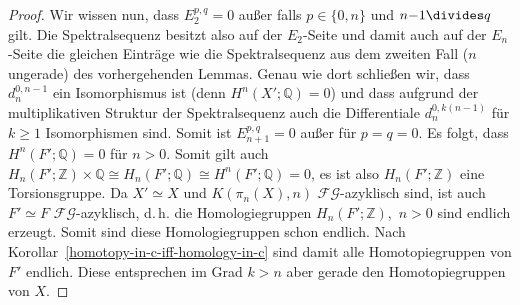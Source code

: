 \documentclass[11pt, a4paper, german]{article}
\theoremstyle{definition}
\theoremstyle{remark}
\newcommand{\Z}{\mathbb{Z}} %
\newcommand{\Q}{\mathbb{Q}} %
\newcommand{\FG}{\mathcal{FG}} %
\renewcommand{\dh}{d.\,h.} %
\begin{document}
\begin{proof}
  Wir wissen nun, dass $E_2^{p,q} = 0$ außer falls $p \in \{ 0, n \}$ und $n{-}1 \divides q$ gilt.
  Die Spektralsequenz besitzt also auf der $E_2$-Seite und damit auch auf der $E_n$-Seite die gleichen Einträge wie die Spektralsequenz aus dem zweiten Fall ($n$ ungerade) des vorhergehenden Lemmas.
  Genau wie dort schließen wir, dass $d_n^{0,n-1}$ ein Isomorphismus ist (denn $H^n(X'; \Q) = 0$) und dass aufgrund der multiplikativen Struktur der Spektralsequenz auch die Differentiale $d_n^{0,k(n-1)}$ für $k \geq 1$ Isomorphismen sind.
  Somit ist $E_{n+1}^{p,q} = 0$ außer für $p = q = 0$.
  Es folgt, dass $H^n(F'; \Q) = 0$ für $n > 0$.
  Somit gilt auch $H_n(F'; \Z) \times \Q \cong H_n(F'; \Q) \cong H^n(F'; \Q) = 0$, es ist also $H_n(F'; \Z)$ eine Torsionsgruppe.
  Da $X' \simeq X$ und $K(\pi_n(X), n)$ $\FG$-azyklisch sind, ist auch $F' \simeq F$ $\FG$-azyklisch, \dh{} die Homologiegruppen $H_n(F'; \Z)$,~$n > 0$ sind endlich erzeugt.
  Somit sind diese Homologiegruppen schon endlich.
  Nach Korollar~\ref{homotopy-in-c-iff-homology-in-c} sind damit alle Homotopiegruppen von $F'$ endlich.
  Diese entsprechen im Grad $k > n$ aber gerade den Homotopiegruppen von $X$.
\end{proof}
\end{document}
